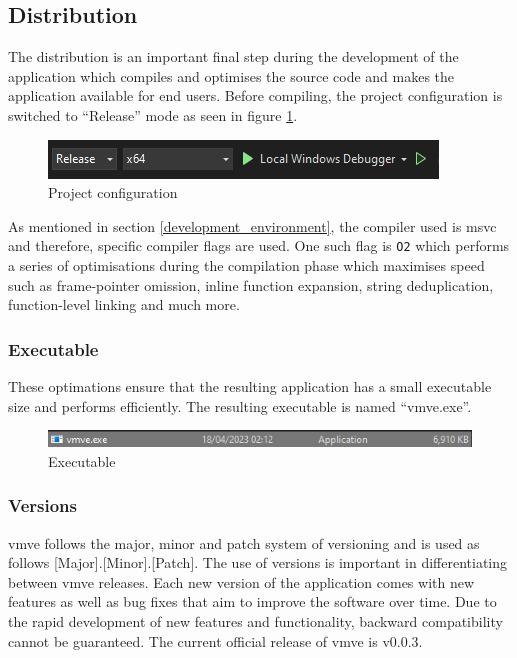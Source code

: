 \documentclass[11pt]{article}
\begin{document}
\subsection{Distribution}
The distribution is an important final step during the development of the
application which compiles and optimises the source code and makes the
application available for end users. Before compiling, the project configuration
is switched to ``Release'' mode as seen in figure \ref{fig:project_configuration}.

\begin{figure}[H]
  \centering
  \includegraphics[width=\textwidth]{images/project_configuration.png}
  \caption{Project configuration}
  \label{fig:project_configuration}
\end{figure}

As mentioned in section \ref{development_environment}, the compiler used is
\gls*{msvc} and therefore, specific compiler flags are used. One such flag is
\lstinline{O2} which performs a series of optimisations during the compilation
phase which maximises speed such as frame-pointer omission, inline function
expansion, string deduplication, function-level linking and much more.

\subsubsection{Executable}
These optimations ensure that the resulting application has a small executable
size and performs efficiently. The resulting executable is named ``vmve.exe''.

\begin{figure}[H]
  \centering
  \includegraphics[width=\textwidth]{images/executable.png}
  \caption{Executable}
  \label{fig:executable}
\end{figure}

\subsubsection{Versions}
\gls*{vmve} follows the major, minor and patch system of versioning and is used
as follows [Major].[Minor].[Patch]. The use of versions is important in
differentiating between \gls*{vmve} releases. Each new version of the application
comes with new features as well as bug fixes that aim to improve the software
over time. Due to the rapid development of new features and functionality,
backward compatibility cannot be guaranteed. The current official release of
\gls*{vmve} is v0.0.3.
\end{document}
